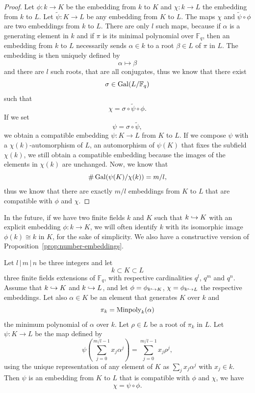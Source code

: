 \begin{proof}
  Let $\phi:k\to K$ be the embedding from $k$ to $K$ and $\chi:k\to L$ the
  embedding from $k$ to $L$. Let $\widetilde\psi:K\to L$ be any embedding from $K$ to
  $L$. The maps $\chi$ and $\widetilde\psi\circ\phi$ are two embeddings from
  $k$ to $L$.
  There are only $l$ such maps, because if $\alpha$ is a generating element in
  $k$ and if $\pi$ is its minimal polynomial over $\mathbb{F}_q$, then an
  embedding from $k$ to $L$ necessarily sends $\alpha\in k$ to a root $\beta\in
  L$ of $\pi$ in $L$.
  The embedding is then uniquely defined by 
  \[
    \alpha\mapsto\beta
  \]
  and there are $l$ such roots, that are all conjugates, thus we know that there
  exist
  \[
    \sigma\in\operatorname{Gal}(L/\mathbb{F}_q)
  \]
  such that
  \[
    \chi = \sigma\circ\widetilde\psi\circ\phi.
  \]
  If we set
  \[
    \psi=\sigma\circ\widetilde\psi,
  \]
  we obtain a compatible embedding $\psi:K\to L$ from $K$ to $L$. If we
  compose $\psi$ with a $\chi(k)$-automorphism of $L$, \ie an automorphism of
  $\psi(K)$ that
  fixes the subfield $\chi(k)$, we still obtain a compatible embedding because
  the images of the elements in $\chi(k)$ are unchanged. Now, we know that
  \[
    \#\operatorname{Gal}(\psi(K)/\chi(k)) = m/l,
  \]
  thus we know that there are exactly $m/l$ embeddings from $K$ to $L$ that
  are compatible with $\phi$ and $\chi$.
\end{proof}
In the future, if we have two finite fields $k$ and $K$ such that $k\hookrightarrow K$
with an explicit embedding $\phi:k\to K$, we will often identify $k$ with
its isomorphic image $\phi(k)\cong k$ in $K$, for the sake of simplicity. We
 also have a constructive version of Proposition~\ref{prop:number-embeddings}.
\begin{prop}
  \label{prop:number-embeddings-constructive}
  Let $l\,|\,m\,|\,n$ be three integers and let
  \[
    k\subset K\subset L
  \]
  three finite fields extensions of $\mathbb{F}_q$, with respective
  cardinalities $q^l$, $q^m$ and $q^n$. Assume that $k\hookrightarrow K$ and $k\hookrightarrow L$,
  and let $\phi=\phi_{k\hookrightarrow K}$, $\chi=\phi_{k\hookrightarrow L}$ the respective embeddings.
  Let also $\alpha\in K$ be an element that generates $K$ over $k$ and
  \[
    \pi_k=\operatorname{Minpoly}_k(\alpha)
  \]
  the minimum polynomial of $\alpha$ over $k$. Let $\rho\in L$ be a root of
  $\pi_k$ in $L$. Let $\psi:K\to L$ be the map defined by
  \[
    \psi(\sum_{j=0}^{m/l-1}x_j\alpha^j) = \sum_{j=0}^{m/l-1}x_j\rho^j,
  \]
  using the unique representation of any element of $K$ as $\sum_j x_j
  \alpha^j$ with $x_j\in k$. Then $\psi$ is an embedding from $K$ to $L$ that
  is compatible with $\phi$ and $\chi$, \ie we have
  \[
    \chi = \psi\circ\phi.
  \]
\end{prop}
